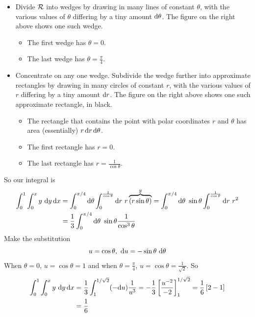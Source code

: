 {\begin{eg}
\begin{itemize}
\item
Divide $\mathcal{R}$ into wedges by drawing in many lines of constant 
$\theta$, with the various values of $\theta$ differing by a tiny 
amount $\mathrm{d}\theta$. The figure on the right above shows one such wedge.
\vspace{-\topsep}
\begin{itemize} \itemsep1pt \parskip0pt 
\item
The first wedge has $\theta=0$.
\item
The last wedge has $\theta=\frac{\pi}{4}$.
\end{itemize}
\vspace{-\topsep}
\item
Concentrate on any one wedge. Subdivide the wedge further into
approximate rectangles by drawing in many circles of constant $r$, 
with the various values of $r$ differing by a tiny amount $\mathrm{d}r$.
The figure on the right above shows one such approximate rectangle, in black.
\vspace{-\topsep}
\begin{itemize} \itemsep1pt \parskip0pt 
\item
The rectangle that contains the point with polar coordinates $r$ and 
$\theta$ has area (essentially) $r\,\mathrm{d}r\,\mathrm{d}\theta$.
\item
The first rectangle has $r=0$.
\item
The last rectangle has $r=\frac{1}{\cos\theta}$.
\end{itemize}
\vspace{-\topsep}
\end{itemize}
So our integral is
\begin{align*}
\int_0^1\int_0^x y\ \dee{y}\,\dee{x}
&=\int_0^{\pi/4}\dee{\theta}\int_0^{\frac{1}{\cos\theta}}\dee{r}\ 
     r\overbrace{(r\sin\theta)}^{y}
=\int_0^{\pi/4}\dee{\theta}\ \sin\theta\int_0^{\frac{1}{\cos\theta}}\dee{r}\ 
     r^2 \\
&=\frac{1}{3}\int_0^{\pi/4}\dee{\theta}\ \sin\theta\frac{1}{\cos^3\theta} 
\end{align*}
Make the substitution
\begin{equation*}
u=\cos\theta,\ \dee{u}=-\sin\theta\ \dee{\theta}
\end{equation*}
When $\theta=0$, $u=\cos\theta=1$ and when $\theta=\frac{\pi}{4}$,
$u=\cos\theta=\frac{1}{\sqrt{2}}$. So
\begin{align*}
\int_0^1\int_0^x y\ \mathrm{d}y\,\mathrm{d}x
&=\frac{1}{3}\int_1^{1/\sqrt{2}} (-\mathrm{d}u)\frac{1}{u^3} 
=-\frac{1}{3}\left[\frac{u^{-2}}{-2}\right]_1^{1/\sqrt{2}} 
=\frac{1}{6}\left[2-1\right]\\
&=\frac{1}{6}
\end{align*}


\end{eg}
}

